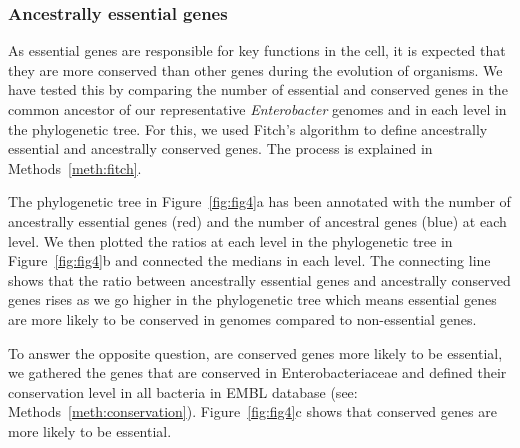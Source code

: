 \documentclass[12pt,letterpaper]{article}
\begin{document}
\subsubsection{Ancestrally essential genes}
As essential genes are responsible for key functions in the cell, it is expected that they are more conserved than  other genes during the evolution of organisms. We have tested this by comparing the number of essential and conserved genes in the common ancestor of our representative \textit{Enterobacter} genomes and in each level in the phylogenetic tree. For this, we used Fitch's algorithm \cite{fitch_toward_1971} to define ancestrally essential and ancestrally conserved genes. The process is explained in Methods~\ref{meth:fitch}. %

The phylogenetic tree in Figure~\ref{fig:fig4}a has been annotated with the number of ancestrally essential genes (red) and the number of ancestral genes (blue) at each level. We then plotted the ratios at each level in the phylogenetic tree in Figure~\ref{fig:fig4}b and connected the medians in each level. The connecting line shows that the ratio between ancestrally essential genes and ancestrally conserved genes rises as we go higher in the phylogenetic tree which means essential genes are more likely to be conserved in genomes compared to non-essential genes.

To answer the opposite question, are conserved genes more likely to be essential, we gathered the genes that are conserved in Enterobacteriaceae and defined their conservation level in all bacteria in EMBL database \cite{stoesser_embl_2002} (see: Methods~\ref{meth:conservation}). Figure~\ref{fig:fig4}c shows that conserved genes are more likely to be essential.
\end{document}
